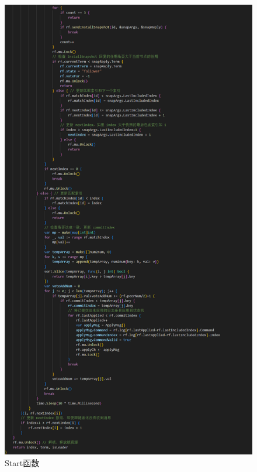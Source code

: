 \documentclass[]{article}
\begin{document}
\begin{itemize}
\begin{figure}[H]
			\includegraphics[height=0.95\textheight]{./2D/Start3.png}
			\caption{Start函数}
		\end{figure}
	\end{itemize}
\end{document}
